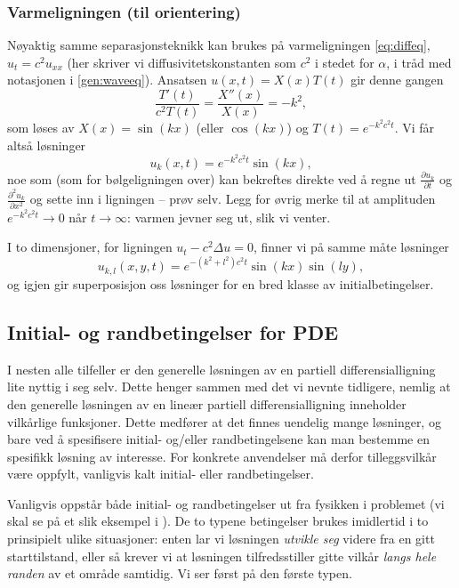 \subsubsection{Varmeligningen (til orientering)}
Nøyaktig samme separasjonsteknikk kan brukes på varmeligningen \eqref{eq:diffeq}, $u_t = c^2u_{xx}$ (her skriver vi diffusivitetskonstanten som $c^2$ i stedet for $\alpha$, i tråd med notasjonen i \eqref{gen:waveeq}). Ansatsen $u(x,t)=X(x)T(t)$ gir denne gangen
\[
\frac{T'(t)}{c^2T(t)} = \frac{X''(x)}{X(x)} = -k^2,
\]
som løses av $X(x)=\sin(kx)$ (eller $\cos(kx)$) og $T(t)=e^{-k^2c^2t}$. Vi får altså løsninger
\begin{equation}\label{heat:trig}
u_k(x,t) = e^{-k^2c^2t}\sin(kx),
\end{equation}
noe som (som for bølgeligningen over) kan bekreftes direkte ved å regne ut $\frac{\partial u_k}{\partial t}$ og $\frac{\partial^2 u_k}{\partial x^2}$ og sette inn i ligningen -- prøv selv. Legg for øvrig merke til at amplituden $e^{-k^2c^2t}\to 0$ når $t\to\infty$: varmen jevner seg ut, slik vi venter.

I to dimensjoner, for ligningen $u_t-c^2\Delta u=0$, finner vi på samme måte løsninger
\[
u_{k,l}(x,y,t) = e^{-(k^2+l^2)c^2t}\sin(kx)\sin(ly),
\]
og igjen gir superposisjon oss løsninger for en bred klasse av initialbetingelser.

\subsection{Initial- og randbetingelser for PDE}
I nesten alle tilfeller er den generelle løsningen av en partiell differensialligning
lite nyttig i seg selv. Dette henger sammen med det vi nevnte tidligere, nemlig at den generelle løsningen av en lineær partiell differensialligning inneholder vilkårlige funksjoner. Dette medfører at det finnes uendelig mange løsninger, og bare ved å spesifisere initial- og/eller randbetingelsene kan man bestemme en spesifikk løsning av interesse. For konkrete anvendelser må derfor tilleggsvilkår være oppfylt, vanligvis kalt initial- eller randbetingelser. 

Vanligvis oppstår både initial- og randbetingelser ut fra fysikken i problemet (vi skal se på et slik eksempel i ). De to typene betingelser brukes imidlertid i to prinsipielt ulike situasjoner: enten lar vi løsningen \emph{utvikle seg} videre fra en gitt starttilstand, eller så krever vi at løsningen tilfredsstiller gitte vilkår \emph{langs hele randen} av et område samtidig. Vi ser først på den første typen.

